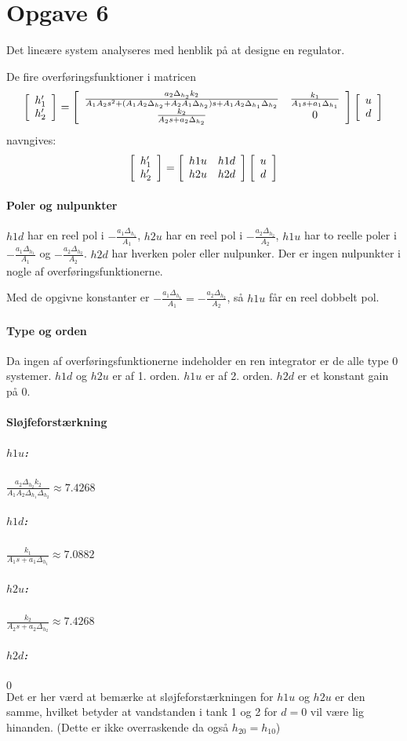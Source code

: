 \section{Opgave 6}
Det lineære system analyseres med henblik på at designe en regulator.

De fire overføringsfunktioner i matricen
\begin{equation*}
\matrix{c}{}{}{ h'_1 \\ h'_2 } =
\matrix{c c}{}{}{
\frac{ a_2 \Delta_{h_2} k_2 }
	{ A_1A_2s^2
	+ ( A_1 A_2 \Delta_{h_2} + A_2 A_1 \Delta_{h_2} ) s
	+ A_1 A_2 \Delta_{h_1} \Delta_{h_2} } &
\frac{k_1}{ A_1 s + a_1 \Delta_{h_1} } \\
\frac{k_2}{ A_2 s + a_2 \Delta_{h_2} } &
0
}
\matrix{c}{}{}{ u \\ d }
\end{equation*}
navngives:
\begin{equation*}
\matrix{c}{}{}{ h'_1 \\ h'_2 } =
\matrix{c c}{}{}{
h1u & h1d \\ h2u & h2d
}
\matrix{c}{}{}{ u \\ d }
\end{equation*}

\paragraph{Poler og nulpunkter}
	$h1d$ har en reel pol i $-\frac{a_1\Delta_{h_1}}{A_1}$, $h2u$ har en reel pol i
	$-\frac{a_2\Delta_{h_2}}{A_2}$, $h1u$ har to reelle poler i
	$-\frac{a_1\Delta_{h_1}}{A_1}$ og $-\frac{a_2\Delta_{h_2}}{A_2}$. $h2d$ har
	hverken poler eller nulpunker. Der er ingen nulpunkter i nogle af
	overføringsfunktionerne.
	
	Med de opgivne konstanter er $-\frac{a_1\Delta_{h_1}}{A_1} =
	-\frac{a_2\Delta_{h_2}}{A_2}$, så $h1u$ får en reel dobbelt pol.
\paragraph{Type og orden}
	Da ingen af overføringsfunktionerne indeholder en ren integrator er de alle
	type 0 systemer. $h1d$ og $h2u$ er af 1. orden. $h1u$ er af 2. orden. $h2d$ er
	et konstant gain på 0.
\paragraph{Sløjfeforstærkning}
	\subparagraph{$h1u$:}
		$\frac{a_2\Delta_{h_2}k_2}{A_1A_2\Delta_{h_1}\Delta_{h_2}} \approx 7.4268$
	\subparagraph{$h1d$:}
		$\frac{k_1}{A_1s + a_1\Delta_{h_1}} \approx 7.0882$
	\subparagraph{$h2u$:}
		$\frac{k_2}{A_2s + a_2\Delta_{h_2}} \approx 7.4268$
	\subparagraph{$h2d$:}
		$0$\\
	Det er her værd at bemærke at sløjfeforstærkningen for $h1u$ og $h2u$ er den
	samme, hvilket betyder at vandstanden i tank 1 og 2 for $d=0$ vil være lig
	hinanden. (Dette er ikke overraskende da også $h_{20} = h_{10}$)
